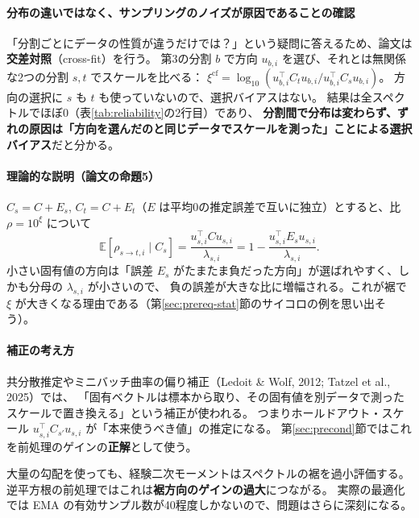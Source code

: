 \documentclass[a4paper,11pt]{ltjsarticle}
\theoremstyle{definition}
\theoremstyle{plain}
\newcommand{\E}{\mathbb{E}}
\newcommand{\T}{^{\top}}
\begin{document}
\paragraph{分布の違いではなく、サンプリングのノイズが原因であることの確認}
「分割ごとにデータの性質が違うだけでは？」という疑問に答えるため、論文は\textbf{交差対照}（cross-fit）を行う。
第3の分割 $b$ で方向 $u_{b,i}$ を選び、それとは無関係な2つの分割 $s, t$ でスケールを比べる：
$\xi^{\mathrm{cf}} = \log_{10}(u_{b,i}\T C_tu_{b,i}/u_{b,i}\T C_su_{b,i})$。
方向の選択に $s$ も $t$ も使っていないので、選択バイアスはない。
結果は全スペクトルでほぼ0（表\ref{tab:reliability}の2行目）であり、
\textbf{分割間で分布は変わらず、ずれの原因は「方向を選んだのと同じデータでスケールを測った」ことによる選択バイアス}だと分かる。

\paragraph{理論的な説明（論文の命題5）}
$C_s = C + E_s$, $C_t = C + E_t$（$E$ は平均0の推定誤差で互いに独立）とすると、比 $\rho = 10^\xi$ について
\begin{equation}
  \E[\rho_{s\to t,i}\mid C_s] = \frac{u_{s,i}\T Cu_{s,i}}{\lambda_{s,i}} = 1 - \frac{u_{s,i}\T E_su_{s,i}}{\lambda_{s,i}} .
\end{equation}
小さい固有値の方向は「誤差 $E_s$ がたまたま負だった方向」が選ばれやすく、しかも分母の $\lambda_{s,i}$ が小さいので、
負の誤差が大きな比に増幅される。これが裾で $\xi$ が大きくなる理由である（第\ref{sec:prereq-stat}節のサイコロの例を思い出そう）。

\paragraph{補正の考え方}
共分散推定やミニバッチ曲率の偏り補正（Ledoit \& Wolf, 2012; Tatzel et al., 2025）では、
「固有ベクトルは標本から取り、その固有値を別データで測ったスケールで置き換える」という補正が使われる。
つまりホールドアウト・スケール $u_{s,i}\T C_{s'}u_{s,i}$ が「本来使うべき値」の推定になる。
第\ref{sec:precond}節ではこれを前処理のゲインの\textbf{正解}として使う。

\begin{pointbox}
大量の勾配を使っても、経験二次モーメントはスペクトルの裾を過小評価する。
逆平方根の前処理ではこれは\textbf{裾方向のゲインの過大}につながる。
実際の最適化では EMA の有効サンプル数が40程度しかないので、問題はさらに深刻になる。
\end{pointbox}
\end{document}
